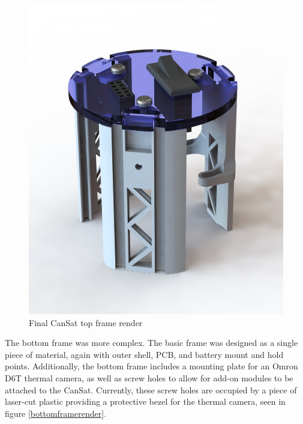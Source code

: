 \documentclass[]{report}
\begin{document}

\begin{figure}[h]
	\hfill\includegraphics[scale=0.4]{Top_frame_render.jpg}\hspace*{\fill}
	\caption{Final CanSat top frame render}
	\label{topframerender}
\end{figure}

The bottom frame was more complex. The basic frame was designed as a single piece of material, again with outer shell, PCB, and battery mount and hold points. Additionally, the bottom frame includes a mounting plate for an Omron D6T thermal camera, as well as screw holes to allow for add-on modules to be attached to the CanSat. Currently, these screw holes are occupied by a piece of laser-cut plastic providing a protective bezel for the thermal camera, seen in figure \ref{bottomframerender}.
\end{document}
